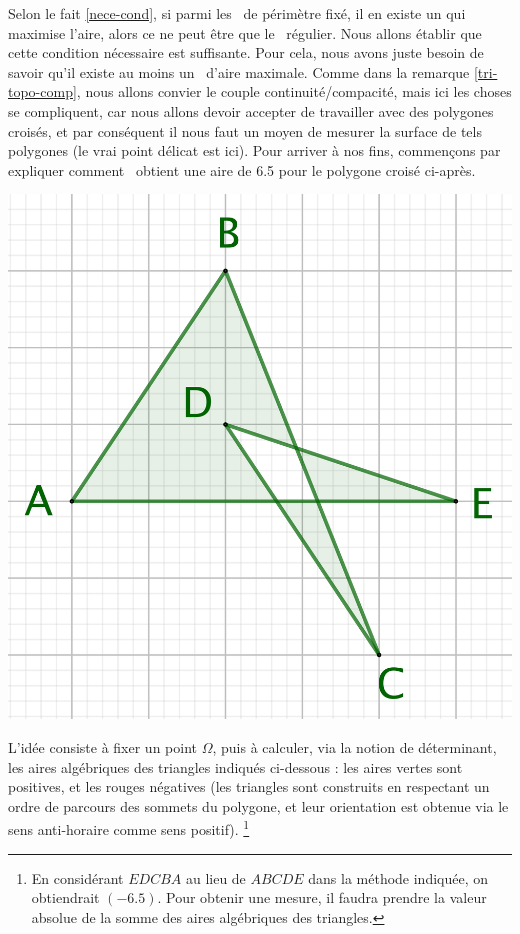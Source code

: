 Selon le fait \ref{nece-cond}, si parmi les \ngones\ de périmètre fixé, il en existe un qui maximise l'aire, alors ce ne peut être que le \ngone\ régulier. Nous allons établir que cette condition nécessaire est suffisante. Pour cela, nous avons juste besoin de savoir qu'il existe au moins un \ngone\ d'aire maximale.
Comme dans la remarque \ref{tri-topo-comp}, nous allons convier le couple continuité/compacité, mais ici les choses se compliquent, car nous allons devoir accepter de travailler avec des polygones croisés, et par conséquent il nous faut un moyen de mesurer la surface de tels polygones (le vrai point délicat est ici). 
Pour arriver à nos fins, commençons par expliquer comment \geogebra\ obtient une aire de \num{6.5} pour le polygone croisé ci-après.


\begin{center}
	\includegraphics[scale=.4]{content/polygon/sufficient-cond/alg-surf-why.png}
\end{center}


\medskip
 

L'idée consiste à fixer un point $\Omega$, puis à calculer, via la notion de déterminant, les aires algébriques des triangles indiqués ci-dessous : les aires vertes sont positives, et les rouges négatives (les triangles sont construits en respectant un ordre de parcours des sommets du polygone, et leur orientation est obtenue via le sens anti-horaire comme sens positif).%
\footnote{
	En considérant $EDCBA$ au lieu de $ABCDE$ dans la méthode indiquée, on obtiendrait $(\num{-6.5})$. Pour obtenir une mesure, il faudra prendre la valeur absolue de la somme des aires algébriques des triangles.
}

